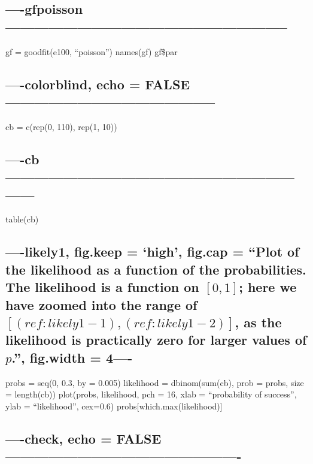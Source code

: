 \documentclass[]{article}
\begin{document}
\subsection{----gfpoisson-----------------------------------------------------------}\label{gfpoisson}

gf = goodfit(e100, ``poisson'') names(gf) gf\$par

\subsection{----colorblind, echo =
FALSE--------------------------------------------}\label{colorblind-echo-false}

cb = c(rep(0, 110), rep(1, 10))

\subsection{----cb------------------------------------------------------------------}\label{cb}

table(cb)

\subsection{\texorpdfstring{----likely1, fig.keep = `high', fig.cap =
``Plot of the likelihood as a function of the probabilities. The
likelihood is a function on \([0, 1]\); here we have zoomed into the
range of \([(ref:likely1-1), (ref:likely1-2)]\), as the likelihood is
practically zero for larger values of \(p\).'', fig.width =
4----}{----likely1, fig.keep = high, fig.cap = Plot of the likelihood as a function of the probabilities. The likelihood is a function on {[}0, 1{]}; here we have zoomed into the range of {[}(ref:likely1-1), (ref:likely1-2){]}, as the likelihood is practically zero for larger values of p., fig.width = 4----}}\label{likely1-fig.keep-high-fig.cap-plot-of-the-likelihood-as-a-function-of-the-probabilities.-the-likelihood-is-a-function-on-0-1-here-we-have-zoomed-into-the-range-of-reflikely1-1-reflikely1-2-as-the-likelihood-is-practically-zero-for-larger-values-of-p.-fig.width-4-}

probs = seq(0, 0.3, by = 0.005) likelihood = dbinom(sum(cb), prob =
probs, size = length(cb)) plot(probs, likelihood, pch = 16, xlab =
``probability of success'', ylab = ``likelihood'', cex=0.6)
probs{[}which.max(likelihood){]}

\subsection{----check, echo =
FALSE-------------------------------------------------}\label{check-echo-false-}
\end{document}
